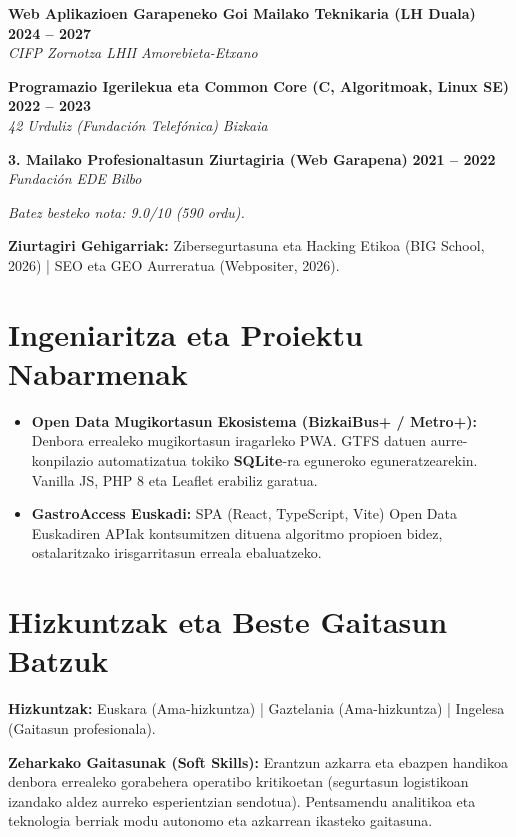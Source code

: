 \documentclass[a4paper,10pt]{article}
\newcommand{\jobheader}[4]{
    \noindent\textbf{#1} \hfill \textbf{#2} \\
    \textit{#3} \hfill \textit{#4} \vspace{3pt}
}
\begin{document}
\jobheader{Web Aplikazioen Garapeneko Goi Mailako Teknikaria (LH Duala)}{2024 -- 2027}{CIFP Zornotza LHII}{Amorebieta-Etxano}
\vspace{3pt}

\jobheader{Programazio Igerilekua eta Common Core (C, Algoritmoak, Linux SE)}{2022 -- 2023}{42 Urduliz (Fundación Telefónica)}{Bizkaia}
\vspace{3pt}

\jobheader{3. Mailako Profesionaltasun Ziurtagiria (Web Garapena)}{2021 -- 2022}{Fundación EDE}{Bilbo}
\small \textit{Batez besteko nota: 9.0/10 (590 ordu).}
\vspace{4pt}

\noindent \textbf{Ziurtagiri Gehigarriak:} Zibersegurtasuna eta Hacking Etikoa (BIG School, 2026) | SEO eta GEO Aurreratua (Webpositer, 2026).

\section{Ingeniaritza eta Proiektu Nabarmenak}

\begin{itemize}[leftmargin=12pt, itemsep=4pt, topsep=4pt]
    \item \textbf{Open Data Mugikortasun Ekosistema (BizkaiBus+ / Metro+):} Denbora errealeko mugikortasun iragarleko PWA. GTFS datuen aurre-konpilazio automatizatua tokiko \textbf{SQLite}-ra eguneroko eguneratzearekin. Vanilla JS, PHP 8 eta Leaflet erabiliz garatua.
    \item \textbf{GastroAccess Euskadi:} SPA (React, TypeScript, Vite) Open Data Euskadiren APIak kontsumitzen dituena algoritmo propioen bidez, ostalaritzako irisgarritasun erreala ebaluatzeko.
\end{itemize}

\section{Hizkuntzak eta Beste Gaitasun Batzuk}

\noindent \textbf{Hizkuntzak:} Euskara (Ama-hizkuntza) | Gaztelania (Ama-hizkuntza) | Ingelesa (Gaitasun profesionala).
\vspace{4pt}

\noindent \textbf{Zeharkako Gaitasunak (Soft Skills):} Erantzun azkarra eta ebazpen handikoa denbora errealeko gorabehera operatibo kritikoetan (segurtasun logistikoan izandako aldez aurreko esperientzian sendotua). Pentsamendu analitikoa eta teknologia berriak modu autonomo eta azkarrean ikasteko gaitasuna.
\end{document}
